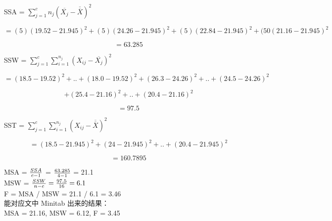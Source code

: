 SSA = \(\sum_{j=1}^c n_j(\overline{X_j} - \overline{\overline{X}})^2\)

\[= (5)(19.52 - 21.945)^2 + (5)(24.26 - 21.945)^2 + (5)(22.84 - 21.945)^2 + (50(21.16 - 21.945)^2\]

\[= 63.285\]

SSW = \(\sum_{j=1}^c \sum_{i=1}^{n_j} (X_{ij} - \overline{X_j})^2\)

\[=(18.5 - 19.52)^2 + . . + (18.0 - 19.52)^2 + (26.3 - 24.26)^2 + . . + (24.5 - 24.26)^2\]

\[+(25.4 - 21.16)^2 + . . + (20.4 - 21.16)^2\]

\[= 97.5\]

SST =
\(\sum_{j=1}^c \sum_{i=1}^{n_j} (X_{ij} - \overline{\overline{X}})^2\)

\[= (18.5 - 21.945)^2 + (24 - 21.945)^2 + ..+ (20.4 - 21.945)^2\]

\[= 160.7895\]

MSA = \({SSA \over c-1}\) = \({63.285 \over 4-1}\) = 21.1\\
MSW = \({SSW \over n -c} = {97.5 \over 16}= 6.1\)\\
F = MSA / MSW = 21.1 / 6.1 = 3.46\\
能对应文中 Minitab 出来的结果：\\
MSA = 21.16, MSW = 6.12, F = 3.45\\

